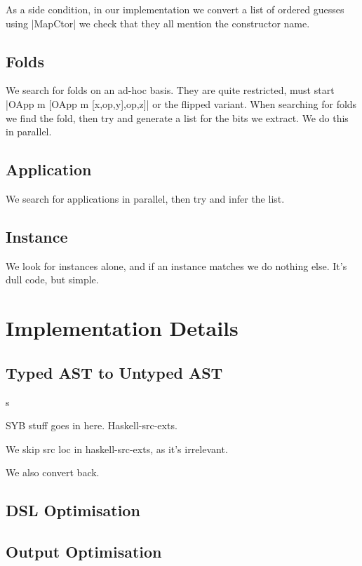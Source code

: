 \documentclass[preprint,draft]{sigplanconf}
\begin{document}
As a side condition, in our implementation we convert a list of ordered guesses using |MapCtor| we check that they all mention the constructor name.

\subsection{Folds}

We search for folds on an ad-hoc basis. They are quite restricted, must start |OApp m [OApp m [x,op,y],op,z]| or the flipped variant. When searching for folds we find the fold, then try and generate a list for the bits we extract. We do this in parallel.

\subsection{Application}

We search for applications in parallel, then try and infer the list.

\subsection{Instance}

We look for instances alone, and if an instance matches we do nothing else. It's dull code, but simple.



\section{Implementation Details}
\label{sec:implementation}

\subsection{Typed AST to Untyped AST}s
\label{sec:universe}

SYB stuff goes in here. Haskell-src-exts.

We skip src loc in haskell-src-exts, as it's irrelevant.

We also convert back.

\subsection{DSL Optimisation}

\subsection{Output Optimisation}
\label{sec:simplify}
\end{document}
